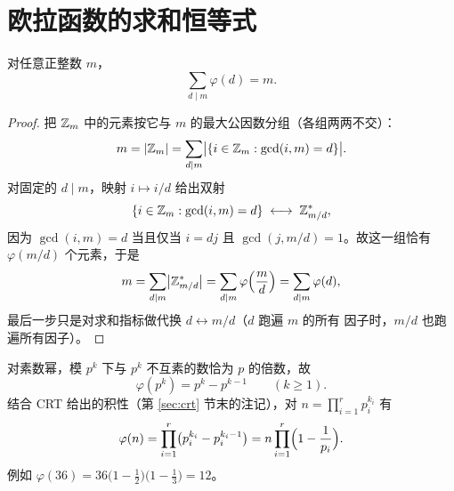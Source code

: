 \section{欧拉函数的求和恒等式}\label{sec:phisum}

\begin{theorem}\label{thm:gauss-sum}
对任意正整数 $m$，
\[
  \sum_{d\mid m}\varphi(d)=m.
\]
\end{theorem}

\begin{proof}
把 $\mathbb{Z}_m$ 中的元素按它与 $m$ 的最大公因数分组（各组两两不交）：
\[
  m=|\mathbb{Z}_m|
  =\sum_{d\mid m}\bigl|\{i\in\mathbb{Z}_m : \gcd(i,m)=d\}\bigr|.
\]
对固定的 $d\mid m$，映射 $i\mapsto i/d$ 给出双射
\[
  \{i\in\mathbb{Z}_m : \gcd(i,m)=d\}\;\longleftrightarrow\;\mathbb{Z}_{m/d}^{*},
\]
因为 $\gcd(i,m)=d$ 当且仅当 $i=dj$ 且 $\gcd(j,m/d)=1$。故这一组恰有
$\varphi(m/d)$ 个元素，于是
\[
  m=\sum_{d\mid m}\bigl|\mathbb{Z}_{m/d}^{*}\bigr|
   =\sum_{d\mid m}\varphi\Bigl(\frac{m}{d}\Bigr)
   =\sum_{d\mid m}\varphi(d),
\]
最后一步只是对求和指标做代换 $d\leftrightarrow m/d$（$d$ 跑遍 $m$ 的所有
因子时，$m/d$ 也跑遍所有因子）。
\end{proof}

\begin{remark}[欧拉函数的计算（补充）]
对素数幂，模 $p^k$ 下与 $p^k$ 不互素的数恰为 $p$ 的倍数，故
\[
  \varphi(p^k)=p^k-p^{k-1}\qquad(k\ge1).
\]
结合 CRT 给出的积性（第 \ref{sec:crt} 节末的注记），对
$n=\prod_{i=1}^{r}p_i^{k_i}$ 有
\[
  \varphi(n)=\prod_{i=1}^{r}\bigl(p_i^{k_i}-p_i^{k_i-1}\bigr)
  =n\prod_{i=1}^{r}\Bigl(1-\frac{1}{p_i}\Bigr).
\]
例如 $\varphi(36)=36\bigl(1-\tfrac12\bigr)\bigl(1-\tfrac13\bigr)=12$。
\end{remark}
